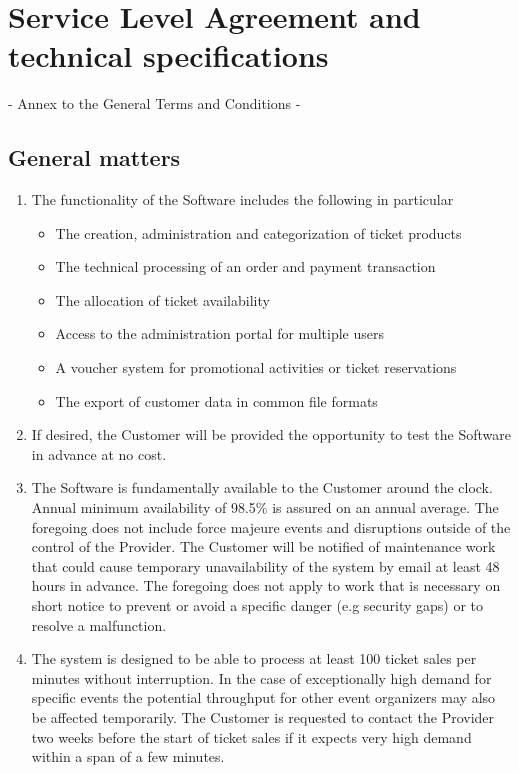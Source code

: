 \documentclass{terms}
\begin{document}
\newpage
\section{Service Level Agreement and technical specifications}
\begin{center}
- Annex to the General Terms and Conditions -
\end{center}
\subsection{General matters}
\begin{enumerate}
\item The functionality of the Software includes the following in particular \begin{itemize}
\item The creation, administration and categorization of ticket products 
\item The technical processing of an order and payment transaction 
\item The allocation of ticket availability 
\item Access to the administration portal for multiple users 
\item A voucher system for promotional activities or ticket reservations 
\item The export of customer data in common file formats
\end{itemize}
\item If desired, the Customer will be provided the opportunity to test the Software in advance at no cost.
\item The Software is fundamentally available to the Customer around the clock. Annual minimum availability of 98.5\% is assured on an annual average. The foregoing does not include force majeure events and disruptions outside of the control of the Provider. The Customer will be notified of maintenance work that could cause temporary unavailability of the system by email at least 48 hours in advance. The foregoing does not apply to work that is necessary on short notice to prevent or avoid a specific danger (e.g security gaps) or to resolve a malfunction.
\item The system is designed to be able to process at least 100 ticket sales per minutes without interruption. In the case of exceptionally high demand for specific events the potential throughput for other event organizers may also be affected temporarily. The Customer is requested to contact the Provider two weeks before the start of ticket sales if it expects very high demand within a span of a few minutes.

\end{enumerate}
\end{document}
